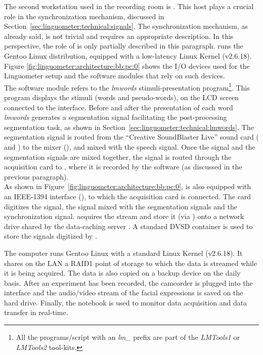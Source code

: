 The second workstation used in the recording room is . 
This host plays a crucial role in the synchronization mechanism, discussed in
Section~\ref{sec:linguometer:technical:signals}.
The synchronization mechanism, as already said, is not trivial and requires an
appropriate description. 
In this perspective, the role of  is only partially described in this
paragraph.
 runs the Gentoo Linux distribution, equipped with a low-latency
Linux Kernel (v2.6.18).
Figure \ref{fig:linguometer:architecture:bb:pc:0} shows the I/O devices used for
the Linguometer setup and the software modules that rely on such devices.\\
The  software module refers to the \emph{lmwords}
stimuli-presentation program\footnote{All the programs/script with an
\emph{lm\_} prefix are part of the \emph{LMTools1} or \emph{LMTools2}
tool-kits.}. 
This program displays the stimuli (words and pseudo-words), on the LCD screen
connected to the  interface.
Before and after the presentation of each word \emph{lmwords} generates a 
segmentation signal facilitating the post-processing segmentation task, as
shown in Section~\ref{sec:linguometer:technical:lmwords}.
The segmentation signal is routed from the  ``Creative SoundBlaster 
Live'' sound card ( and ) to the mixer
(), and mixed with the  speech signal.
Once the  signal and the segmentation signals are mixed together, the
signal is routed through the acquisition card  to , where
it is  recorded by the  software (as discussed in the previous
paragraph).\\
As shown in Figure~\ref{fig:linguometer:architecture:bb:pc:0},  is also
equipped with an IEEE-1394 interface (), to which the 
 acquisition card is connected. 
The  card digitizes the  signal, the  signal
mixed with the segmentation signals and the  synchronization signal.
 acquires the stream and store it (via ) onto a network
drive shared by the data-caching server .
A standard DVSD container is used to store the signals digitized by .

The  computer runs Gentoo Linux with a standard Linux Kernel (v2.6.18).
It shares on the  LAN a RAID1 point of storage to which the data is
streamed while it is being acquired.
The data is also copied on a backup device on the daily basis.
After an experiment has been recorded, the  camcorder is plugged into 
the   interface and the audio/video stream of the facial
expressions is saved on the hard drive.
Finally, the  notebook is used to monitor data acquisition and data 
transfer in real-time.
